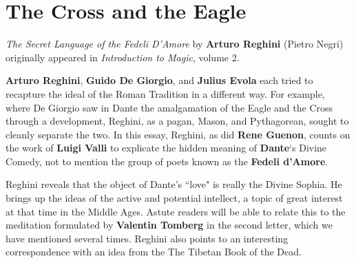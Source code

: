 \section{The Cross and the Eagle}

\textit{The Secret Language of the Fedeli D'Amore} by \textbf{Arturo Reghini} (Pietro Negri) originally appeared in \textit{Introduction to Magic}, volume 2.

\begin{quotex}
\textbf{Arturo Reghini}, \textbf{Guido De Giorgio}, and \textbf{Julius Evola} each tried to recapture the ideal of the Roman Tradition in a different way. For example, where De Giorgio saw in Dante the amalgamation of the Eagle and the Cross through a development, Reghini, as a pagan, Mason, and Pythagorean, sought to cleanly separate the two. In this essay, Reghini, as did \textbf{Rene Guenon}, counts on the work of \textbf{Luigi Valli} to explicate the hidden meaning of \textbf{Dante}`s Divine Comedy, not to mention the group of poets known as the \textbf{Fedeli d'Amore}.

Reghini reveals that the object of Dante's ``love" is really the Divine Sophia. He brings up the ideas of the active and potential intellect, a topic of great interest at that time in the Middle Ages. Astute readers will be able to relate this to the meditation formulated by \textbf{Valentin Tomberg} in the second letter, which we have mentioned several times. Reghini also points to an interesting correspondence with an idea from the The Tibetan Book of the Dead. 

\end{quotex}
